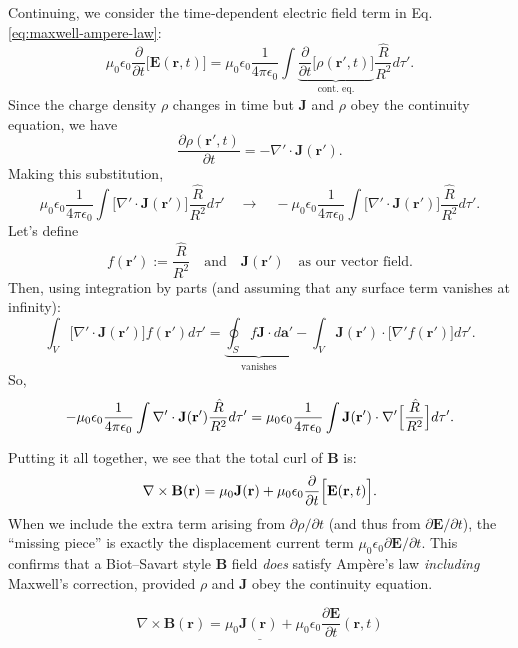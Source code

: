 \documentclass[a4paper,12pt]{article} %
\begin{document}
Continuing, we consider the time‐dependent electric field term in Eq. \eqref{eq:maxwell-ampere-law}:
\begin{equation}
  \mu_0 \epsilon_0 \frac{\partial}{\partial t}\Big[\mathbf{E}(\mathbf{r},t)\Big]= \mu_0 \epsilon_0 \frac{1}{4\pi\epsilon_0}\int
  \underbrace{\frac{\partial}{\partial t}\Big[\rho(\mathbf{r}',t)\Big]}_{\text{cont. eq.}}
  \frac{\hat{R}}{R^2}d\tau'.
\label{eq:displacement-current-term}
\end{equation}
Since the charge density $\rho$ changes in time but $\mathbf{J}$ and $\rho$ obey the continuity equation, we have
$$
  \frac{\partial \rho(\mathbf{r}',t)}{\partial t}=
  -\nabla' \cdot \mathbf{J}(\mathbf{r}').
$$
Making this substitution,
$$
  \mu_0 \epsilon_0 \frac{1}{4\pi\epsilon_0}
  \int 
  \bigl[\nabla' \cdot \mathbf{J}(\mathbf{r}')\bigr]
  \frac{\hat{R}}{R^2}d\tau'
  \quad\longrightarrow\quad
  -\mu_0 \epsilon_0 \frac{1}{4\pi\epsilon_0}
  \int 
  \bigl[\nabla' \cdot \mathbf{J}(\mathbf{r}')\bigr]
  \frac{\hat{R}}{R^2}d\tau'.
$$
Let's define
$$
  f(\mathbf{r}') := \frac{\hat{R}}{R^2}
  \quad\text{and}\quad
  \mathbf{J}(\mathbf{r}')
  \quad\text{as our vector field.}
$$
Then, using integration by parts (and assuming that any surface term vanishes at infinity):
$$
  \int_{V} \bigl[\nabla' \cdot \mathbf{J}(\mathbf{r}')\bigr]
  f(\mathbf{r}')d\tau'=\underbrace{\oint_{S} f \mathbf{J}\cdot d\mathbf{a}'}_{\text{vanishes}} -\int_{V} \mathbf{J}(\mathbf{r}') \cdot \bigl[\nabla' f(\mathbf{r}')\bigr] d\tau'.
$$
So, 
$$
  -\mu_0 \epsilon_0 \frac{1}{4\pi\epsilon_0}
  \int \nabla' \cdot \mathbf{J}(\mathbf{r}') \frac{\hat{R}}{R^2}
  d\tau'=\mu_0 \epsilon_0 \frac{1}{4\pi\epsilon_0} \int \mathbf{J}(\mathbf{r}') \cdot \nabla' \Bigl[\frac{\hat{R}}{R^2}\Big] d\tau'.
$$

Putting it all together, we see that the total curl of $\mathbf{B}$ is:
$$
  \nabla \times \mathbf{B}(\mathbf{r})=\mu_0\mathbf{J}(\mathbf{r})+\mu_0\epsilon_0\frac{\partial}{\partial t}\Bigl[\mathbf{E}(\mathbf{r},t)\Bigr].
$$
When we include the extra term arising from 
$\partial\rho/\partial t$ (and thus from $\partial\mathbf{E}/\partial t$), the “missing piece” is exactly the displacement current term $\mu_0\epsilon_0\partial\mathbf{E}/\partial t$.  This confirms that a Biot–Savart style $\mathbf{B}$ field \emph{does} satisfy Ampère’s law \emph{including} 
Maxwell’s correction, provided $\rho$ and $\mathbf{J}$ obey the continuity equation.

$$
\underline{\boxed{
   \nabla \times \mathbf{B}(\mathbf{r})=
   \mu_0\mathbf{J}(\mathbf{r})+
   \mu_0\epsilon_0\frac{\partial \mathbf{E}}{\partial t}(\mathbf{r},t)}}
$$
\end{document}
